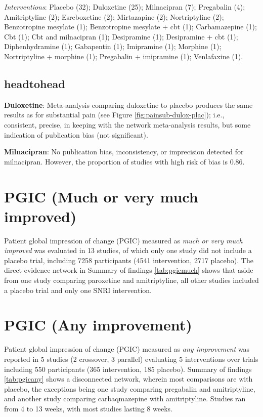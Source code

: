\documentclass{report}\usepackage[]{graphicx}\usepackage[]{color}
\begin{document}
\emph{Interventions}: Placebo (32); Duloxetine (25); Milnacipran (7); Pregabalin (4); Amitriptyline (2); Esreboxetine (2); Mirtazapine (2); Nortriptyline (2); Benzotropine mesylate (1); Benzotropine mesylate + cbt (1); Carbamazepine (1); Cbt (1); Cbt and milnacipran (1); Desipramine (1); Desipramine + cbt (1); Diphenhydramine (1); Gabapentin (1); Imipramine (1); Morphine (1); Nortriptyline + morphine (1); Pregabalin + imipramine (1); Venlafaxine (1).

\subsection{headtohead}

\textbf{Duloxetine}: Meta-analysis comparing duloxetine to placebo produces the same results as for substantial pain (see Figure \ref{fig:painsub-dulox-plac}); i.e., consistent, precise, in keeping with the network meta-analysis results, but some indication of publication bias (not significant).

\textbf{Milnacipran}: No publication bias, inconsistency, or imprecision detected for milnacipran. However, the proportion of studies with high risk of bias is 0.86.


\section{PGIC (Much or very much improved)}

Patient global impression of change (PGIC) measured as \emph{much or very much improved} was evaluated in 13 studies, of which only one study did not include a placebo trial, including 7258 participants (4541 intervention, 2717 placebo). The direct evidence network in Summary of findings \ref{tab:pgicmuch} shows that aside from one study comparing paroxetine and amitriptyline, all other studies included a placebo trial and only one SNRI intervention.




\section{PGIC (Any improvement)}

Patient global impression of change (PGIC) measured as \emph{any improvement} was reported in 5 studies (2 crossover, 3 parallel) evaluating 5 interventions over trials including 550 participants (365 intervention, 185 placebo). Summary of findings \ref{tab:pgicany} shows a disconnected network, wherein most comparisons are with placebo, the exceptions being one study comparing pregabalin and amitriptyline, and another study comparing carbaqmazepine with amitriptyline. Studies ran from 4 to 13 weeks, with most studies lasting 8 weeks.
\end{document}
